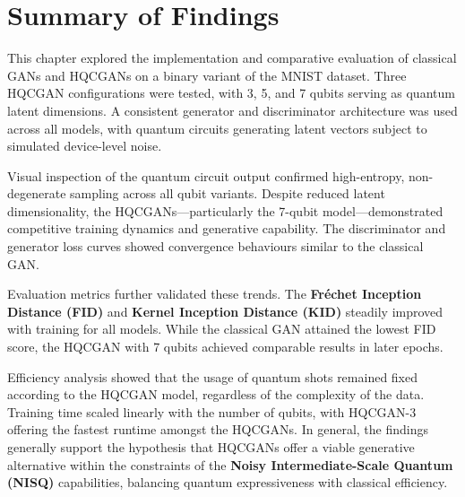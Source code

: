 \section{Summary of Findings}

This chapter explored the implementation and comparative evaluation of classical GANs and HQCGANs on a binary variant of the MNIST dataset. Three HQCGAN configurations were tested, with 3, 5, and 7 qubits serving as quantum latent dimensions. A consistent generator and discriminator architecture was used across all models, with quantum circuits generating latent vectors subject to simulated device-level noise.

Visual inspection of the quantum circuit output confirmed high-entropy, non-degenerate sampling across all qubit variants. Despite reduced latent dimensionality, the HQCGANs—particularly the 7-qubit model—demonstrated competitive training dynamics and generative capability. The discriminator and generator loss curves showed convergence behaviours similar to the classical GAN.

Evaluation metrics further validated these trends. The \textbf{Fréchet Inception Distance (FID)} and \textbf{Kernel Inception Distance (KID)} steadily improved with training for all models. While the classical GAN attained the lowest FID score, the HQCGAN with 7 qubits achieved comparable results in later epochs.

Efficiency analysis showed that the usage of quantum shots remained fixed according to the HQCGAN model, regardless of the complexity of the data. Training time scaled linearly with the number of qubits, with HQCGAN-3 offering the fastest runtime amongst the HQCGANs. In general, the findings generally support the hypothesis that HQCGANs offer a viable generative alternative within the constraints of the \textbf{Noisy Intermediate-Scale Quantum (NISQ)} capabilities, balancing quantum expressiveness with classical efficiency.
